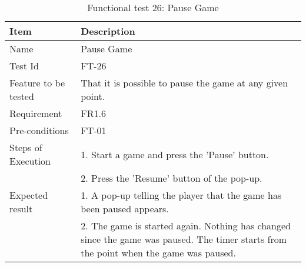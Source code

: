 \begin{table}[H]
\centering
	\begin{tabular}{ l | p{8cm} }
		\hline
		\rowcolor{lightgray}
		{\bf Item} & {\bf Description} \\ \hline
		Name & Pause Game \\ 
		Test Id & FT-26 \\ 
		Feature to be tested & That it is possible to pause the game at any given point. \\ 
		Requirement & FR1.6 \\ 
		Pre-conditions & FT-01 \\ 
		Steps of Execution & 1. Start a game and press the 'Pause' button. \\
		& 2. Press the 'Resume' button of the pop-up. \\
		Expected result & 1. A pop-up telling the player that the game has been paused appears. \\
		& 2. The game is started again. Nothing has changed since the game was paused. The timer starts from the point when the game was paused. \\
		\hline
	\end{tabular}
	\caption{Functional test 26: Pause Game}
\end{table}

